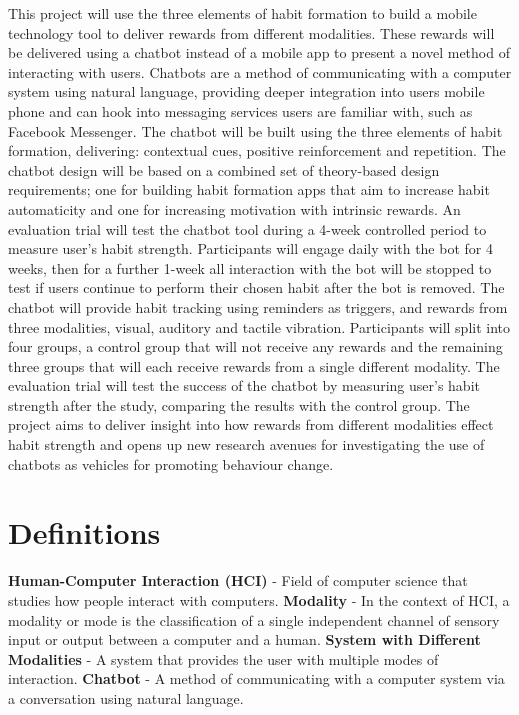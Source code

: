 This project will use the three elements of habit formation to build a mobile technology tool to deliver rewards from different modalities. These rewards will be delivered using a chatbot instead of a mobile app to present a novel method of interacting with users. Chatbots are a method of communicating with a computer system using natural language, providing deeper integration into users mobile phone and can hook into messaging services users are familiar with, such as Facebook Messenger. The chatbot will be built using the three elements of habit formation, delivering: contextual cues, positive reinforcement and repetition. The chatbot design will be based on a combined set of theory-based design requirements; one for building habit formation apps that aim to increase habit automaticity and one for increasing motivation with intrinsic rewards.\newline
\newline
An evaluation trial will test the chatbot tool during a 4-week controlled period to measure user's habit strength. Participants will engage daily with the bot for 4 weeks, then for a further 1-week all interaction with the bot will be stopped to test if users continue to perform their chosen habit after the bot is removed. The chatbot will provide habit tracking using reminders as triggers, and rewards from three modalities, visual, auditory and tactile vibration. Participants will split into four groups, a control group that will not receive any rewards and the remaining three groups that will each receive rewards from a single different modality. The evaluation trial will test the success of the chatbot by measuring user's habit strength after the study, comparing the results with the control group.\newline
\newline
The project aims to deliver insight into how rewards from different modalities effect habit strength and opens up new research avenues for investigating the use of chatbots as vehicles for promoting behaviour change.
\newpage

\section*{Definitions}

\textbf{Human-Computer Interaction (HCI)} - Field of computer science that studies how people interact with computers.\newline
\newline
\textbf{Modality} - In the context of HCI, a modality or mode is the classification of a single independent channel of sensory input or output between a computer and a human.\newline
\newline
\textbf{System with Different Modalities} - A system that provides the user with multiple modes of interaction.\newline
\newline
\textbf{Chatbot} - A method of communicating with a computer system via a conversation using natural language.

\newpage
